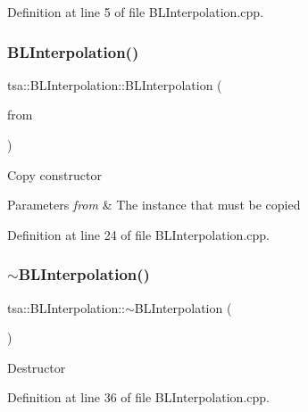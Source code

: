 Definition at line 5 of file B\+L\+Interpolation.\+cpp.

\mbox{\label{classtsa_1_1_b_l_interpolation_ace4ab80e2c9f5147685bd22d5ee5841e}} 
\subsubsection{\texorpdfstring{B\+L\+Interpolation()}{BLInterpolation()}\hspace{0.1cm}{\footnotesize\ttfamily [2/2]}}
{\footnotesize\ttfamily tsa\+::\+B\+L\+Interpolation\+::\+B\+L\+Interpolation (\begin{DoxyParamCaption}\item[{const \hyperlink{classtsa_1_1_b_l_interpolation}{B\+L\+Interpolation} \&}]{from }\end{DoxyParamCaption})}

Copy constructor


\begin{DoxyParams}{Parameters}
{\em from} & The instance that must be copied \\
\hline
\end{DoxyParams}


Definition at line 24 of file B\+L\+Interpolation.\+cpp.

\mbox{\label{classtsa_1_1_b_l_interpolation_a67cd882b93c7643cd0fdce08b7fa876f}} 
\subsubsection{\texorpdfstring{$\sim$\+B\+L\+Interpolation()}{~BLInterpolation()}}
{\footnotesize\ttfamily tsa\+::\+B\+L\+Interpolation\+::$\sim$\+B\+L\+Interpolation (\begin{DoxyParamCaption}{ }\end{DoxyParamCaption})}

Destructor 

Definition at line 36 of file B\+L\+Interpolation.\+cpp.



